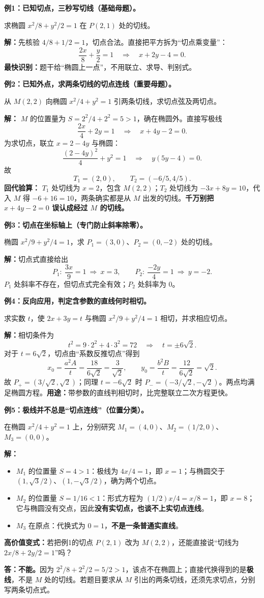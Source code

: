 \begin{examplebox}
\textbf{例1：已知切点，三秒写切线（基础母题）。}

求椭圆 $x^2/8+y^2/2=1$ 在 $P(2,1)$ 处的切线。

\textbf{解：}先核验 $4/8+1/2=1$，切点合法。直接把平方拆为“切点乘变量”：
\[
 \frac{2x}{8}+\frac{y}{2}=1
 \quad\Longrightarrow\quad
 \boxed{x+2y-4=0}.
\]
\textbf{最快识别：}题干给“椭圆上一点”，不用联立、求导、判别式。

\medskip
\textbf{例2：已知外点，求两条切线的切点连线（重要母题）。}

从 $M(2,2)$ 向椭圆 $x^2/4+y^2=1$ 引两条切线，求切点弦及两切点。

\textbf{解：} $M$ 的位置量为 $S=2^2/4+2^2=5>1$，确在椭圆外。直接写极线
\[
 \frac{2x}{4}+2y=1
 \quad\Longrightarrow\quad
 \boxed{x+4y-2=0}.
\]
为求切点，联立 $x=2-4y$ 与椭圆：
\[
 \frac{(2-4y)^2}{4}+y^2=1
 \quad\Longrightarrow\quad y(5y-4)=0.
\]
故
\[
 \boxed{T_1=(2,0),\qquad T_2=(-6/5,4/5).}
\]
\textbf{回代验算：} $T_1$ 处切线为 $x=2$，包含 $M(2,2)$；$T_2$ 处切线为 $-3x+8y=10$，代入 $M$ 得 $-6+16=10$，两条确实都是从 $M$ 出发的切线。\textbf{千万别把 $x+4y-2=0$ 误认成经过 $M$ 的切线。}

\medskip
\textbf{例3：切点在坐标轴上（专门防止斜率除零）。}

椭圆 $x^2/9+y^2/4=1$，求 $P_1=(3,0)$、$P_2=(0,-2)$ 处的切线。

\textbf{解：}切点式直接给出
\[
 P_1:\ \frac{3x}{9}=1\ \Longrightarrow\ \boxed{x=3},
 \qquad
 P_2:\ \frac{-2y}{4}=1\ \Longrightarrow\ \boxed{y=-2}.
\]
$P_1$ 处斜率不存在，但切点式完全有效；$P_2$ 处斜率为 $0$。

\medskip
\textbf{例4：反向应用，判定含参数的直线何时相切。}

求实数 $t$，使 $2x+3y=t$ 与椭圆 $x^2/9+y^2/4=1$ 相切，并求相应切点。

\textbf{解：}相切条件为
\[
 t^2=9\cdot2^2+4\cdot3^2=72
 \quad\Longrightarrow\quad
 \boxed{t=\pm6\sqrt2}.
\]
对于 $t=6\sqrt2$，切点由“系数反推切点”得到
\[
 x_0=\frac{a^2A}{t}=\frac{18}{6\sqrt2}=\frac{3}{\sqrt2},
 \qquad
 y_0=\frac{b^2B}{t}=\frac{12}{6\sqrt2}=\sqrt2.
\]
故 $P_+=(3/\sqrt2,\sqrt2)$；同理 $t=-6\sqrt2$ 时 $P_-=(-3/\sqrt2,-\sqrt2)$。两点均满足椭圆方程。\textbf{用途：}带参数的直线判相切时，比完整联立二次方程更快。

\medskip
\textbf{例5：极线并不总是“切点连线”（位置分类）。}

在椭圆 $x^2/4+y^2=1$ 上，分别研究 $M_1=(4,0)$、$M_2=(1/2,0)$、$M_3=(0,0)$。

\textbf{解：}
\begin{itemize}
    \item $M_1$ 的位置量 $S=4>1$：极线为 $4x/4=1$，即 $x=1$；与椭圆交于 $(1,\sqrt3/2)$、$(1,-\sqrt3/2)$，确为两个切点。
    \item $M_2$ 的位置量 $S=1/16<1$：形式方程为 $(1/2)x/4=x/8=1$，即 $x=8$；它与椭圆没有交点，因此\textbf{没有实切点，也谈不上实切点连线}。
    \item $M_3$ 在原点：代换式为 $0=1$，\textbf{不是一条普通实直线}。
\end{itemize}

\medskip
\textbf{高价值变式：}若把例1的切点 $P(2,1)$ 改为 $M(2,2)$，还能直接说“切线为 $2x/8+2y/2=1$”吗？

\textbf{答：不能。}因为 $2^2/8+2^2/2=5/2>1$，该点不在椭圆上；直接代换得到的是\textbf{极线}，不是 $M$ 处的切线。若题目要求从 $M$ 引出的两条切线，还须先求切点，分别写两条切点式。
\end{examplebox}
